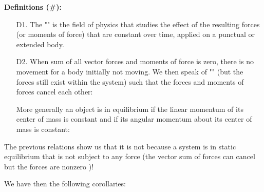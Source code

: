 	\textbf{Definitions (\#\mydef):}
	\begin{enumerate}
		\item[D1.] The "" is the field of physics that studies the effect of the resulting forces (or moments of force) that are constant over time, applied on a punctual or extended body.

		\item[D2.] When sum of all vector forces and moments of force is zero, there is no movement for a body initially not moving. We then speak of "" (but the forces still exist within the system) such that the forces and moments of forces cancel each other:
		
		More generally an object is in equilibrium if the linear momentum of its center of mass is constant and if its angular momentum about its center of mass is constant:
	\end{enumerate} 
	\begin{tcolorbox}[title=Remark,colframe=black,arc=10pt]
	The previous relations show us that it is not because a system is in static equilibrium that is not subject to any force (the vector sum of forces can cancel but the forces are nonzero )!
	\end{tcolorbox}
	We have then the following corollaries:
